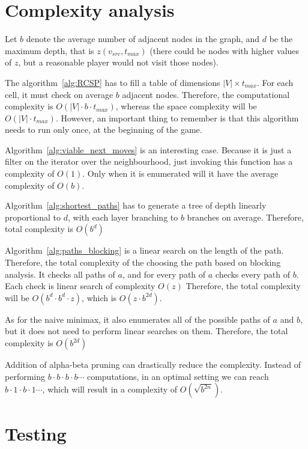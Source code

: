 \documentclass[12pt]{article}
\begin{document}
\clearpage
\section{Complexity analysis}

Let $b$ denote the average number of adjacent nodes in the graph,
and $d$ be the maximum depth, that is $z(v_{src},t_{max})$ (there could be nodes with higher values of $z$, but a reasonable player would not visit those nodes).

The algorithm~\ref*{alg:RCSP} has to fill a table of dimensions $|V| \times t_{max}$.
For each cell, it must check on average $b$ adjacent nodes.
Therefore, the computational complexity is $O(|V| \cdot b \cdot t_{max})$, whereas the space complexity will be $O(|V| \cdot t_{max})$.
However, an important thing to remember is that this algorithm needs to run only once, at the beginning of the game.

Algorithm~\ref{alg:viable_next_moves} is an interesting case.
Because it is just a filter on the iterator over the neighbourhood, just invoking this function has a complexity of $O(1)$.
Only when it is enumerated will it have the average complexity of $O(b)$.

Algorithm~\ref{alg:shortest_paths} has to generate a
tree of depth linearly proportional to $d$,
with each layer branching to $b$ branches on average.
Therefore, total complexity is $O(b^d)$

Algorithm~\ref{alg:paths_blocking} is a linear search on the length of the path.
Therefore, the total complexity of the choosing the path based on blocking analysis.
It checks all paths of $a$, and for every path of $a$ checks every path of $b$.
Each check is linear search of complexity $O(z)$
Therefore, the total complexity will be $O(b^d \cdot b^d \cdot z)$, which is $O(z \cdot b^{2d})$.

As for the naive minimax, it also enumerates all of the possible paths of $a$ and $b$,
but it does not need to perform linear searches on them.
Therefore, the total complexity is $O(b^{2d})$

Addition of alpha-beta pruning can drastically reduce the complexity.
Instead of performing $b \cdot b \cdot b \cdot b \cdots$ computations,
in an optimal setting we can reach $b \cdot 1 \cdot b \cdot 1 \cdots$, which will result in a complexity of $O(\sqrt{b^{2n}})$.

\clearpage
\section{Testing}
\end{document}
